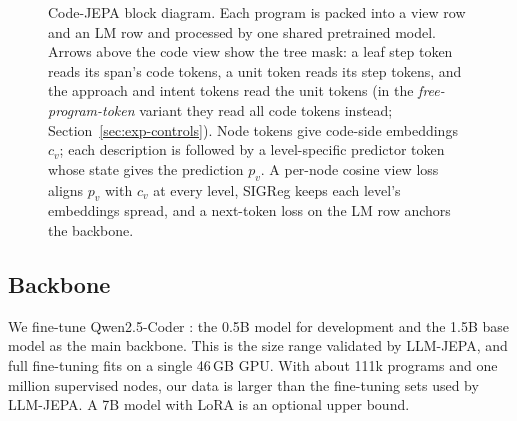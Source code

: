\documentclass[11pt]{article}
\newcommand{\Lcal}{\mathcal{L}}
\newcommand{\SIGReg}{\operatorname{SIGReg}}
\begin{document}
\begin{figure}[t]
{}
\caption{Code-JEPA block diagram. Each program is packed into a view row and an LM row and processed by one shared
pretrained model. Arrows above the code view show the tree mask: a leaf step token reads its span's code tokens, a
unit token reads its step tokens, and the approach and intent tokens read the unit tokens (in the
\emph{free-program-token} variant they read all code tokens instead; Section~\ref{sec:exp-controls}). Node tokens give
code-side embeddings $c_v$; each description is followed by a level-specific predictor token whose state gives the
prediction $p_v$. A per-node cosine view loss aligns $p_v$ with $c_v$ at every level, SIGReg keeps each level's
embeddings spread, and a next-token loss on the LM row anchors the backbone.}
\label{fig:arch}
\end{figure}

\subsection{Backbone}
We fine-tune Qwen2.5-Coder \citep{hui2024qwen25coder}: the 0.5B model for development and the 1.5B base model as
the main backbone. This is the size range validated by LLM-JEPA, and full fine-tuning fits on a single 46\,GB GPU.
With about 111k programs and one million supervised nodes, our data is larger than the fine-tuning sets used by
LLM-JEPA. A 7B model with LoRA is an optional upper bound.
\end{document}
